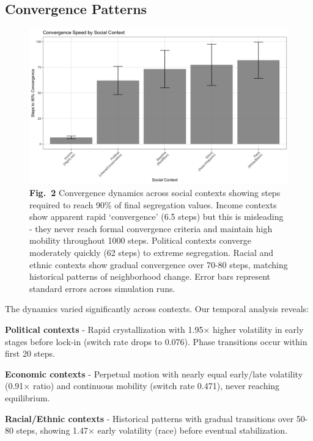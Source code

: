 \documentclass[pdflatex,sn-basic]{sn-jnl}%
\begin{document}
\subsection{Convergence Patterns}\label{convergence-patterns}


\begin{figure}[ht]
\centering
\includegraphics[width=\textwidth]{figures/convergence-viz-1.png}
\caption{\textbf{Fig.~2} Convergence dynamics across social contexts showing
steps required to reach 90\% of final segregation values. Income
contexts show apparent rapid `convergence' (6.5 steps) but this is
misleading - they never reach formal convergence criteria and maintain
high mobility throughout 1000 steps. Political contexts converge
moderately quickly (62 steps) to extreme segregation. Racial and ethnic
contexts show gradual convergence over 70-80 steps, matching historical
patterns of neighborhood change. Error bars represent standard errors
across simulation runs.}
\label{fig:convergence}
\end{figure}

The dynamics varied significantly across contexts. Our temporal analysis
reveals:

\textbf{Political contexts} - Rapid crystallization with 1.95× higher
volatility in early stages before lock-in (switch rate drops to 0.076).
Phase transitions occur within first 20 steps.

\textbf{Economic contexts} - Perpetual motion with nearly equal
early/late volatility (0.91× ratio) and continuous mobility (switch rate
0.471), never reaching equilibrium.

\textbf{Racial/Ethnic contexts} - Historical patterns with gradual
transitions over 50-80 steps, showing 1.47× early volatility (race)
before eventual stabilization.
\end{document}
